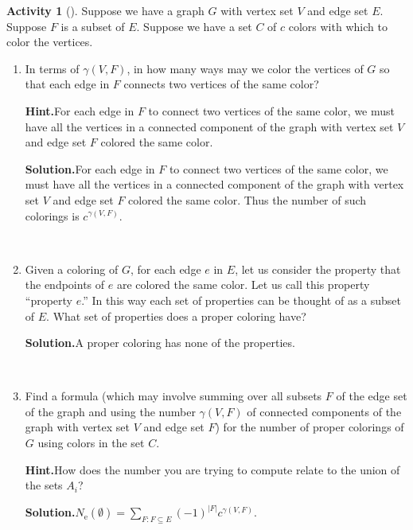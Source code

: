 \documentclass[10pt,]{book}
\theoremstyle{plain}
\theoremstyle{definition}
\newtheorem{activity}[project]{Activity}
\numberwithin{equation}{chapter}
\begin{document}
\begin{activity}[]\label{activity-235}
Suppose we have a graph \(G\) with vertex set \(V\) and edge set \(E\). Suppose \(F\) is a subset of \(E\). Suppose we have a set \(C\) of \(c\) colors with which to color the vertices.%
~\par
\begin{enumerate}[label=(\alph*)]
 \item In terms of \(\gamma(V,F)\), in how many ways may we color the vertices of \(G\) so that each edge in \(F\) connects two vertices of the same color?%
\par\medskip\noindent%
\textbf{Hint.}\quad For each edge in \(F\) to connect two vertices of the same color, we must have all the vertices in a connected component of the graph  with vertex set \(V\) and edge set \(F\) colored the same color.%
\par\medskip\noindent%
\textbf{Solution.}\quad For each edge in \(F\) to connect two vertices of the same color, we must have all the vertices in a connected component of the graph with vertex set \(V\) and edge set \(F\) colored the same color. Thus the number of such colorings is \(c^{\gamma(V,F)}\).%

~\par
\item Given a coloring of \(G\), for each edge \(e\) in \(E\), let us consider the property that the endpoints of \(e\) are colored the same color.  Let us call this property ``property \(e\).''  In this way each set of properties can be thought of as a subset of \(E\).  What set of properties does a proper coloring have?%
\par\medskip\noindent%
\textbf{Solution.}\quad A proper coloring has none of the properties.%

~\par
\item Find a formula (which may involve summing over all subsets \(F\) of the edge set of the graph and using the number \(\gamma(V,F)\) of connected components of the graph with vertex set \(V\) and edge set \(F\)) for the number of proper colorings of \(G\) using colors in the set \(C\).%
\par\medskip\noindent%
\textbf{Hint.}\quad How does the number you are trying to compute relate to the union of the sets \(A_i\)?%
\par\medskip\noindent%
\textbf{Solution.}\quad \(N_{\mbox{e} }(\emptyset)=\sum_{F:F\subseteq E}
(-1)^{|F|}c^{\gamma(V,F)}.\)%

\end{enumerate}
\end{activity}
\end{document}
